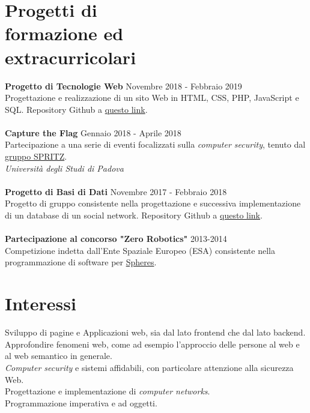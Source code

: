 \documentclass[margin, 10pt]{res}
\begin{document}
\begin{resume}

\section{Progetti di \\ formazione ed \\ extracurricolari}
\textbf{Progetto di Tecnologie Web} \hfill Novembre 2018 - Febbraio 2019 \\
Progettazione e realizzazione di un sito Web in HTML, CSS, PHP, JavaScript e SQL. Repository Github a \href{https://github.com/enricobu96/TecWebUNIPD}{questo link}. \\ \\
\textbf{Capture the Flag} \hfill Gennaio 2018 - Aprile 2018 \\
Partecipazione a una serie di eventi focalizzati sulla \textit{computer security}, tenuto dal \href{https://spritz.math.unipd.it/}{gruppo SPRITZ}. \\
\textit{Università degli Studi di Padova} \\ \\
\textbf{Progetto di Basi di Dati} \hfill Novembre 2017 - Febbraio 2018 \\
Progetto di gruppo consistente nella progettazione e successiva implementazione di un database di un social network. Repository Github a \href{https://github.com/enricobu96/DB1718}{questo link}. \\ \\
\textbf{Partecipazione al concorso "Zero Robotics"} \hfill 2013-2014 \\
Competizione indetta dall'Ente Spaziale Europeo (ESA) consistente nella programmazione di software per \href{https://www.esa.int/Science_Exploration/Human_and_Robotic_Exploration/Education/Robot_Spheres_in_zero-gravity_action}{Spheres}.


\section{Interessi}
Sviluppo di pagine e Applicazioni web, sia dal lato frontend che dal lato backend. \\
Approfondire fenomeni web, come ad esempio l'approccio delle persone al web e al web semantico in generale. \\
\textit{Computer security} e sistemi affidabili, con particolare attenzione alla sicurezza Web. \\
Progettazione e implementazione di \textit{computer networks}. \\
Programmazione imperativa e ad oggetti.\\




\end{resume}
\end{document}

